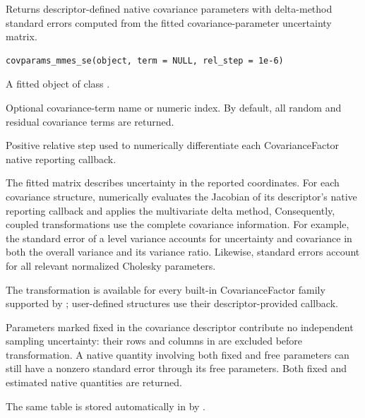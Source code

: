 \documentclass[a4paper]{book}
\begin{document}
%
\begin{Description}\relax
Returns descriptor-defined native covariance parameters with delta-method
standard errors computed from the fitted covariance-parameter uncertainty
matrix.
\end{Description}
%
\begin{Usage}
\begin{verbatim}
covparams_mmes_se(object, term = NULL, rel_step = 1e-6)
\end{verbatim}
\end{Usage}
%
\begin{Arguments}
\begin{ldescription}
\item[\code{object}] A fitted object of class .
\item[\code{term}] Optional covariance-term name or numeric index. By default,
all random and residual covariance terms are returned.
\item[\code{rel\_step}] Positive relative step used to numerically differentiate
each CovarianceFactor native reporting callback.
\end{ldescription}
\end{Arguments}
%
\begin{Details}\relax
The fitted  matrix describes uncertainty in the reported
 coordinates. For each covariance structure,
 numerically evaluates the Jacobian of its descriptor's
native reporting callback and applies the multivariate delta method,
Consequently, coupled transformations use the complete covariance information.
For example, the standard error of a  level variance accounts for
uncertainty and covariance in both the overall variance and its variance ratio.
Likewise,  standard errors account for all relevant normalized
Cholesky parameters.

The transformation is available for every built-in CovarianceFactor family
supported by ; user-defined  structures
use their descriptor-provided  callback.

Parameters marked fixed in the covariance descriptor contribute no independent
sampling uncertainty: their rows and columns in  are excluded
before transformation. A native quantity involving both fixed and free
parameters can still have a nonzero standard error through its free parameters.
Both fixed and estimated native quantities are returned.

The same table is stored automatically in  by
.
\end{Details}
\end{document}
